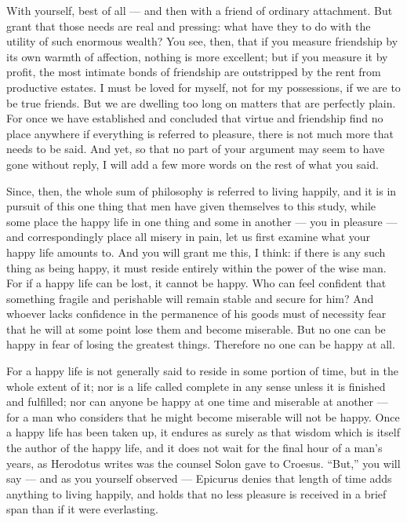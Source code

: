  With yourself, best of all — and then with a friend of ordinary attachment. But grant that those needs are real and pressing: what have they to do with the utility of such enormous wealth? You see, then, that if you measure friendship by its own warmth of affection, nothing is more excellent; but if you measure it by profit, the most intimate bonds of friendship are outstripped by the rent from productive estates. I must be loved for myself, not for my possessions, if we are to be true friends. But we are dwelling too long on matters that are perfectly plain. For once we have established and concluded that virtue and friendship find no place anywhere if everything is referred to pleasure, there is not much more that needs to be said. And yet, so that no part of your argument may seem to have gone without reply, I will add a few more words on the rest of what you said.

 Since, then, the whole sum of philosophy is referred to living happily, and it is in pursuit of this one thing that men have given themselves to this study, while some place the happy life in one thing and some in another — you in pleasure — and correspondingly place all misery in pain, let us first examine what your happy life amounts to. And you will grant me this, I think: if there is any such thing as being happy, it must reside entirely within the power of the wise man. For if a happy life can be lost, it cannot be happy. Who can feel confident that something fragile and perishable will remain stable and secure for him? And whoever lacks confidence in the permanence of his goods must of necessity fear that he will at some point lose them and become miserable. But no one can be happy in fear of losing the greatest things. Therefore no one can be happy at all.

 For a happy life is not generally said to reside in some portion of time, but in the whole extent of it; nor is a life called complete in any sense unless it is finished and fulfilled; nor can anyone be happy at one time and miserable at another — for a man who considers that he might become miserable will not be happy. Once a happy life has been taken up, it endures as surely as that wisdom which is itself the author of the happy life, and it does not wait for the final hour of a man's years, as Herodotus writes was the counsel Solon gave to Croesus. ``But,'' you will say — and as you yourself observed — Epicurus denies that length of time adds anything to living happily, and holds that no less pleasure is received in a brief span than if it were everlasting.

